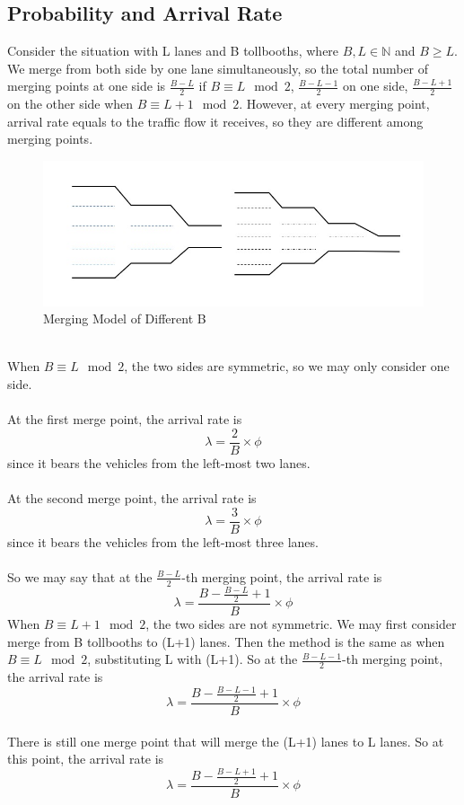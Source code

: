 \subsection{Probability and Arrival Rate}
Consider the situation with L lanes and B tollbooths, where \(B, L \in \mathbb{N}\) and \(B\geqslant L\). We merge from both side by one lane simultaneously, so the total number of merging points at one side is \(\frac{B-L}{2}\) if \(B \equiv L \mod 2\), \(\frac{B-L-1}{2}\) on one side, \(\frac{B-L+1}{2}\) on the other side when \(B \equiv L+1 \mod 2\). However, at every merging point, arrival rate equals to the traffic flow it receives, so they are different among merging points.\\
\begin{figure}[h]
\small
\centering
\includegraphics[width=12cm]{562831237.jpg}
\caption{Merging Model of Different B} \label{fig: Merging Model of Different B}
\end{figure}
\\
When  \(B \equiv L \mod 2\), the two sides are symmetric, so we may only consider one side.\\
\\
At the first merge point, the arrival rate is\\
\[
\lambda = \frac{2}{B} \times \phi
\]
since it bears the vehicles from the left-most two lanes.\\
\\
\noindent
At the second merge point, the arrival rate is\\
\[
\lambda = \frac{3}{B} \times \phi
\]
since it bears the vehicles from the left-most three lanes.\\
\\
So we may say that at the \(\frac{B-L}{2}\)-th merging point, the arrival rate is\\
\[
\lambda = \frac{B - \frac{B-L}{2}+1}{B} \times \phi
\]
When \(B \equiv L+1\mod 2\), the two sides are not symmetric. We may first consider merge from B tollbooths to (L+1) lanes. Then the method is the same as when \(B \equiv L \mod 2\), substituting L with (L+1). So at the \(\frac{B-L-1}{2}\)-th merging point, the arrival rate is\\
\[
\lambda = \frac{B-\frac{B-L-1}{2}+1}{B} \times \phi
\]
\\
There is still one merge point that will merge the (L+1) lanes to L lanes. So at this point, the arrival rate is\\ 
\[
\lambda = \frac{B-\frac{B-L+1}{2}+1}{B} \times \phi
\]

